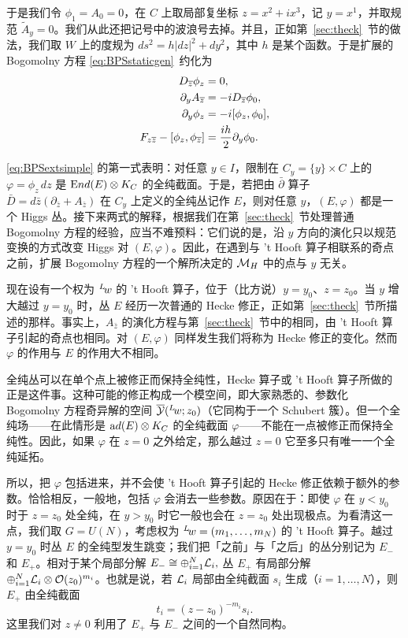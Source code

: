 于是我们令 $\phi_1=A_0=0$，在 $C$ 上取局部复坐标 $z=x^2+ix^3$，记 $y=x^1$，并取规范 $\tilde A_y=0$。我们从此还把记号中的波浪号去掉。并且，正如第~\ref{sec:theck}~节的做法，我们取 $W$ 上的度规为 $ds^2=h |dz|^2+ dy^2$，其中 $h$ 是某个函数。于是扩展的 Bogomolny 方程 \eqref{eq:BPSstaticgen}\ 约化为
\setcounter{equation}{35}
\begin{equation}\label{eq:BPSextsimple}
\begin{aligned}D_\bz\phi_z&=0,\\
\partial_y A_\bz&=-i D_\bz \phi_0,\\
\partial_y\phi_z&=-i[\phi_z,\phi_0],\\
F_{z\bz}-[\phi_z,\phi_\bz]&={ih\over 2}\partial_y\phi_0.\end{aligned}
\end{equation}

\eqref{eq:BPSextsimple} 的第一式表明：对任意 $y\in I$，限制在 $C_y=\{y\}\times C$ 上的 $\varphi=\phi_z\,dz$ 是 $\End(E)\otimes K_C$ 的全纯截面。于是，若把由 $\bar\partial$ 算子 $\bar D=d\bar z(\partial_{\bar z}+A_{\bar z})$ 在 $C_y$ 上定义的全纯丛记作 $E$，则对任意 $y$，$(E,\varphi)$ 都是一个 Higgs 丛。接下来两式的解释，根据我们在第~\ref{sec:theck}~节处理普通 Bogomolny 方程的经验，应当不难预料：它们说的是，沿 $y$ 方向的演化只以规范变换的方式改变 Higgs 对 $(E,\varphi)$。因此，在遇到与 't Hooft 算子相联系的奇点之前，扩展 Bogomolny 方程的一个解所决定的 $\MH$ 中的点与 $y$ 无关。

现在设有一个权为 $^L\negthinspace w$ 的 't Hooft 算子，位于（比方说）$y=y_0$、$z=z_0$。当 $y$ 增大越过 $y=y_0$ 时，丛 $E$ 经历一次普通的 Hecke 修正，正如第~\ref{sec:theck}~节所描述的那样。事实上，$A_{\bar z}$ 的演化方程与第~\ref{sec:theck}~节中的相同，由 't Hooft 算子引起的奇点也相同。对 $(E,\varphi)$ 同样发生我们将称为 Hecke 修正的变化。然而 $\varphi$ 的作用与 $E$ 的作用大不相同。

全纯丛可以在单个点上被修正而保持全纯性，Hecke 算子或 't Hooft 算子所做的正是这件事。这种可能的修正构成一个模空间，即大家熟悉的、参数化 Bogomolny 方程奇异解的空间 $\bar {\EUY}({}^L\negthinspace w;z_0)$（它同构于一个 Schubert 簇）。但一个全纯场——在此情形是 ${\rm ad}(E)\otimes K_C$ 的全纯截面 $\varphi$——不能在一点被修正而保持全纯性。因此，如果 $\varphi$ 在 $z=0$ 之外给定，那么越过 $z=0$ 它至多只有唯一一个全纯延拓。

所以，把 $\varphi$ 包括进来，并不会使 't Hooft 算子引起的 Hecke 修正依赖于额外的参数。恰恰相反，一般地，包括 $\varphi$ 会消去一些参数。原因在于：即使 $\varphi$ 在 $y<y_0$ 时于 $z=z_0$ 处全纯，在 $y>y_0$ 时它一般也会在 $z=z_0$ 处出现极点。为看清这一点，我们取 $G=U(N)$，考虑权为 $^L\negthinspace w=(m_1,\ldots,m_N)$ 的 't Hooft 算子。越过 $y=y_0$ 时丛 $E$ 的全纯型发生跳变；我们把「之前」与「之后」的丛分别记为 $E_-$ 和 $E_+$。相对于某个局部分解 $E_-\cong \oplus_{i=1}^N \cL_i,$ 丛 $E_+$ 有局部分解 $\oplus_{i=1}^N\cL_i\otimes \CO(z_0)^{m_i}$。也就是说，若 $\cL_i$ 局部由全纯截面 $s_i$ 生成（$i=1,\ldots,N$），则 $E_+$ 由全纯截面 %
\setcounter{equation}{36}
\begin{equation}\label{eq:zilfog}
t_i=(z-z_0)^{-m_i} s_i.
\end{equation}
 这里我们对 $z\neq 0$ 利用了 $E_+$ 与 $E_-$ 之间的一个自然同构。

